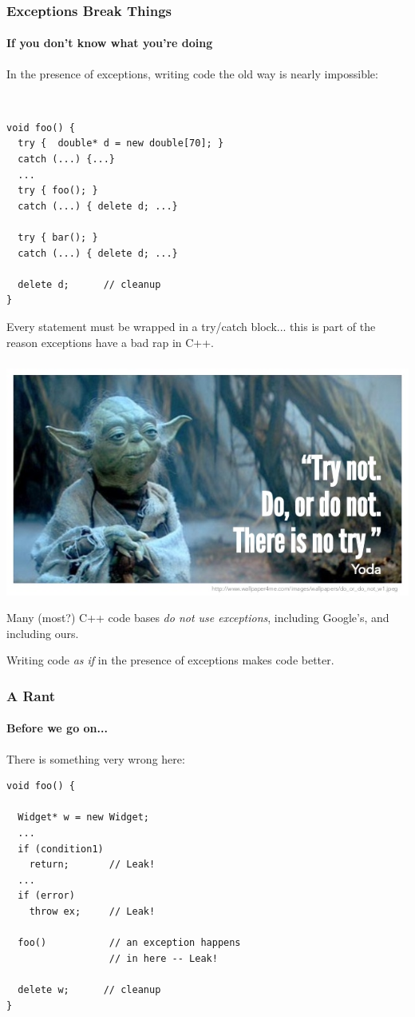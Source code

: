 \begin{frame}[fragile,t]
\frametitle{Exceptions Break Things}
\framesubtitle{If you don't know what you're doing}
In the presence of exceptions, writing code the old way is nearly impossible:
{\scriptsize\
\begin{verbatim}
void foo() {
  try {  double* d = new double[70]; }
  catch (...) {...}
  ...
  try { foo(); }
  catch (...) { delete d; ...}

  try { bar(); } 
  catch (...) { delete d; ...}

  delete d;      // cleanup
}
\end{verbatim}
}
Every statement must be wrapped in a try/catch block... this is part of the reason exceptions have a bad rap in C++.
\end{frame}


\begin{frame}[fragile,t]
\frametitle{}
\includegraphics[scale=0.5]{yoda.jpg}

Many (most?) C++ code bases \emph{do not use exceptions}, including
Google's, and including ours.

Writing code \emph{as if} in the presence of exceptions makes code better.

\end{frame}

\begin{frame}[fragile,t]
\frametitle{A Rant}
\framesubtitle{Before we go on...}
There is something very wrong here:
\pause{}
{\scriptsize \begin{verbatim}
void foo() {

  Widget* w = new Widget;
  ...
  if (condition1)
    return;       // Leak!
  ...
  if (error)
    throw ex;     // Leak!

  foo()           // an exception happens
                  // in here -- Leak!

  delete w;      // cleanup 
}
\end{verbatim}}
\pause
{}

\end{frame}

